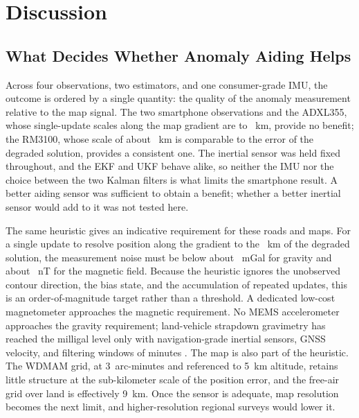 \section{Discussion}
\label{sec:discussion}

\subsection{What Decides Whether Anomaly Aiding Helps}

Across four observations, two estimators, and one consumer-grade IMU, the outcome is ordered by a single quantity: the quality of the anomaly measurement relative to the map signal. The two smartphone observations and the ADXL355, whose single-update scales along the map gradient are \boundscaleadxl{} to \boundscalephonemag~km, provide no benefit; the RM3100, whose scale of about \boundscalermthree~km is comparable to the error of the degraded solution, provides a consistent one. The inertial sensor was held fixed throughout, and the EKF and UKF behave alike, so neither the IMU nor the choice between the two Kalman filters is what limits the smartphone result. A better aiding sensor was sufficient to obtain a benefit; whether a better inertial sensor would add to it was not tested here.

The same heuristic gives an indicative requirement for these roads and maps. For a single update to resolve position along the gradient to the \bounddegradedkm~km of the degraded solution, the measurement noise must be below about \boundreqgrav~mGal for gravity and about \boundreqmag~nT for the magnetic field. Because the heuristic ignores the unobserved contour direction, the bias state, and the accumulation of repeated updates, this is an order-of-magnitude target rather than a threshold. A dedicated low-cost magnetometer approaches the magnetic requirement. No MEMS accelerometer approaches the gravity requirement; land-vehicle strapdown gravimetry has reached the milligal level only with navigation-grade inertial sensors, GNSS velocity, and filtering windows of minutes \citep{yu2015sins}. The map is also part of the heuristic. The WDMAM grid, at 3~arc-minutes and referenced to 5~km altitude, retains little structure at the sub-kilometer scale of the position error, and the free-air grid over land is effectively 9~km. Once the sensor is adequate, map resolution becomes the next limit, and higher-resolution regional surveys would lower it.

